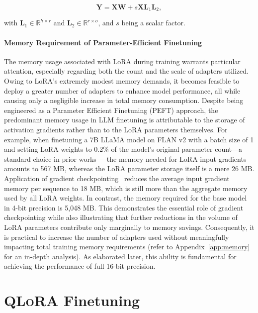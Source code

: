 \begin{equation}
    \mathbf{Y} = \mathbf{X}\mathbf{W} + s\mathbf{X}\mathbf{L}_1\mathbf{L}_2,
\end{equation}

with $\mathbf{L}_1\in  \mathbb{R}^{h\times r}$ and $\mathbf{L}_2\in  \mathbb{R}^{r\times o}$, and $s$ being a scalar factor.

\paragraph{Memory Requirement of Parameter-Efficient Finetuning} The memory usage associated with LoRA during training warrants particular attention, especially regarding both the count and the scale of adapters utilized. Owing to LoRA’s extremely modest memory demands, it becomes feasible to deploy a greater number of adapters to enhance model performance, all while causing only a negligible increase in total memory consumption. Despite being engineered as a Parameter Efficient Finetuning (PEFT) approach, the predominant memory usage in LLM finetuning is attributable to the storage of activation gradients rather than to the LoRA parameters themselves. For example, when finetuning a 7B LLaMA model on FLAN v2 with a batch size of 1 and setting LoRA weights to 0.2\% of the model’s original parameter count—a standard choice in prior works~\citep{hu2021lora,liu2022few}—the memory needed for LoRA input gradients amounts to 567 MB, whereas the LoRA parameter storage itself is a mere 26 MB. Application of gradient checkpointing~\citep{chen2016training} reduces the average input gradient memory per sequence to 18 MB, which is still more than the aggregate memory used by all LoRA weights. In contrast, the memory required for the base model in 4-bit precision is 5,048 MB. This demonstrates the essential role of gradient checkpointing while also illustrating that further reductions in the volume of LoRA parameters contribute only marginally to memory savings. Consequently, it is practical to increase the number of adapters used without meaningfully impacting total training memory requirements (refer to Appendix~\ref{app:memory} for an in-depth analysis). As elaborated later, this ability is fundamental for achieving the performance of full 16-bit precision.

\section{\textsc{QLoRA} Finetuning}

